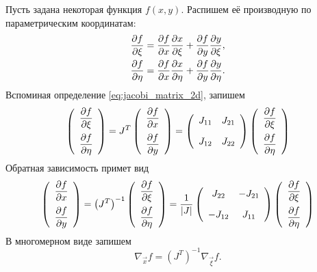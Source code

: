 Пусть задана некоторая функция $f(x, y)$. Распишем её производную по
параметрическим координатам:
\begin{align*}
&\frac{\partial f}{\partial \xi} = \frac{\partial f}{\partial x}\frac{\partial x}{\partial \xi} + \frac{\partial f}{\partial y}\frac{\partial y}{\partial \xi}, \\
&\frac{\partial f}{\partial \eta} = \frac{\partial f}{\partial x}\frac{\partial x}{\partial \eta} + \frac{\partial f}{\partial y}\frac{\partial y}{\partial \eta}.
\end{align*}
Вспоминая определение \cref{eq:jacobi_matrix_2d}, запишем
\begin{equation*}
\left(\begin{array}{c}
  \dfrac{\partial f}{\partial \xi} \\[10pt]
  \dfrac{\partial f}{\partial \eta}
  \end{array}
\right) = 
J^T 
\left(
  \begin{array}{c}
  \dfrac{\partial f}{\partial x} \\[10pt]
  \dfrac{\partial f}{\partial y}
  \end{array}
\right) =
\left(
  \begin{array}{cc}
    J_{11} & J_{21} \\[10pt]
    J_{12} & J_{22}
  \end{array}
\right)
\left(
  \begin{array}{c}
  \dfrac{\partial f}{\partial \xi} \\[10pt]
  \dfrac{\partial f}{\partial \eta}
  \end{array}
\right)
\end{equation*}
Обратная зависимость примет вид
\begin{equation*}
\left(\begin{array}{c}
  \dfrac{\partial f}{\partial x} \\[10pt]
  \dfrac{\partial f}{\partial y}
  \end{array}
\right) = 
\left(J^T\right)^{-1}
\left(
  \begin{array}{c}
  \dfrac{\partial f}{\partial \xi} \\[10pt]
  \dfrac{\partial f}{\partial \eta}
  \end{array}
\right) =
\frac{1}{|J|}
\left(
  \begin{array}{cc}
    J_{22} & -J_{21} \\[10pt]
    -J_{12} & J_{11}
  \end{array}
\right)
\left(
  \begin{array}{c}
  \dfrac{\partial f}{\partial \xi} \\[10pt]
  \dfrac{\partial f}{\partial \eta}
  \end{array}
\right)
\end{equation*}
В многомерном виде запишем
\begin{equation}
\label{eq:vec_grad_dx}
\nabla_{\vec x} f = \left(J^T\right)^{-1} \nabla_{\vec \xi} f.
\end{equation}

